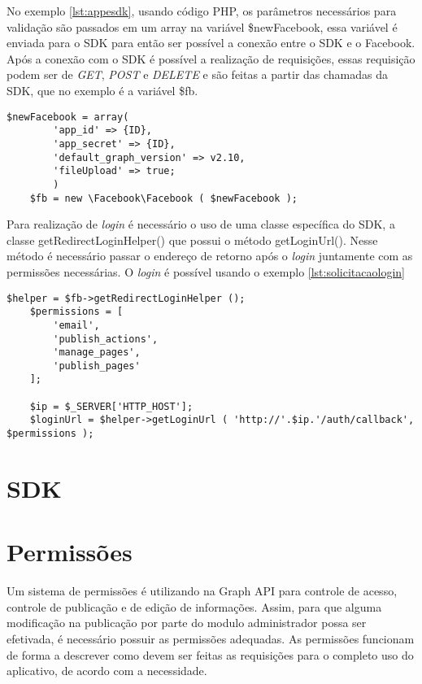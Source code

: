 No exemplo \ref{lst:appesdk}, usando código PHP, os parâmetros necessários para validação são passados em um array na variável \$newFacebook, essa variável é enviada para o SDK para então ser possível a conexão entre o SDK e o Facebook. Após a conexão com o SDK é possível a realização de requisições, essas requisição podem ser de \textit{GET}, \textit{POST} e \textit{DELETE} e são feitas a partir das chamadas da SDK, que no exemplo é a variável \$fb.

\begin{lstlisting}[caption={Conexão entre aplicativo e SDK},label={lst:appesdk}]
	$newFacebook = array(
		'app_id' => {ID},
		'app_secret' => {ID},
		'default_graph_version' => v2.10,
		'fileUpload' => true;
		)
	$fb = new \Facebook\Facebook ( $newFacebook );
\end{lstlisting}

Para realização de \textit{login} é necessário o uso de uma classe específica do SDK, a classe getRedirectLoginHelper() que possui o método getLoginUrl(). Nesse método é necessário passar o endereço de retorno após o \textit{login} juntamente com as permissões necessárias. O \textit{login} é possível usando o exemplo \ref{lst:solicitacaologin}

\begin{lstlisting}[caption={Solicitação de Login},label={lst:solicitacaologin}]
	$helper = $fb->getRedirectLoginHelper ();
	$permissions = [
		'email',
		'publish_actions',
		'manage_pages',
		'publish_pages'
	];

	$ip = $_SERVER['HTTP_HOST'];
	$loginUrl = $helper->getLoginUrl ( 'http://'.$ip.'/auth/callback', $permissions );
\end{lstlisting}


\section{SDK}

\section{Permissões}
Um sistema de permissões é utilizando na Graph API para controle de acesso, controle de publicação e de edição de informações. Assim, para que alguma modificação na publicação por parte do modulo administrador possa ser efetivada, é necessário possuir as permissões adequadas. As permissões funcionam de forma a descrever como devem ser feitas as requisições para o completo uso do aplicativo, de acordo com a necessidade.

